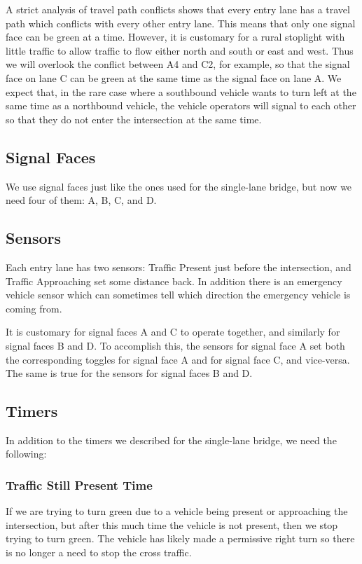 \documentclass[letterpaper,twoside]{article}
\begin{document}
A strict analysis of travel path conflicts shows that every entry lane
has a travel path which conflicts with every other entry lane.  This means
that only one signal face can be green at a time.
However, it is customary for a rural stoplight with little traffic to allow
traffic to flow either north and south or east and west.  
Thus we will overlook the conflict between A4 and C2, for example, so
that the signal face on lane C can be green at the same time as the
signal face on lane A.  We expect that, in the rare case where a southbound
vehicle wants to turn left at the same time as a northbound vehicle,
the vehicle operators will signal to each other so that they do not
enter the intersection at the same time.

\subsection{Signal Faces}

We use signal faces just like the ones used for the single-lane
bridge, but now we need four of them: A, B, C, and D.

\subsection{Sensors}

Each entry lane has two sensors: Traffic Present just before the intersection,
and Traffic Approaching set some distance back.  In addition there is an
emergency vehicle sensor which can sometimes tell which direction
the emergency vehicle is coming from.

It is customary for signal faces A and C to operate together,
and similarly for signal faces B and D.  To accomplish this, the sensors for
signal face A set both the corresponding toggles for signal face A
and for signal face C, and vice-versa.  The same is true for the sensors
for signal faces B and D.

\subsection{Timers}

In addition to the timers we described for the single-lane bridge,
we need the following:

\subsubsection{Traffic Still Present Time}
If we are trying to turn green due to a vehicle being present or approaching
the intersection, but after this much time the vehicle is not present, then
we stop trying to turn green.  The vehicle has likely made a permissive right
turn so there is no longer a need to stop the cross traffic.
\end{document}
